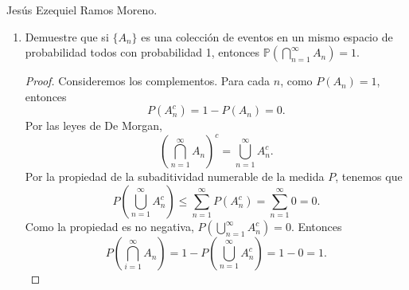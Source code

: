 \documentclass{article}
\newcommand{\ntarea}{1}
\begin{document}
\pagestyle{fancy}
\rhead{Tarea \ntarea}

\large{Jesús Ezequiel Ramos Moreno.}
\begin{enumerate}
    \item[2.] Demuestre que si \(\{A_n\}\) es una colección de eventos en un mismo espacio de probabilidad todos con probabilidad 1, entonces \(\mathbb{P}(\bigcap_{n=1}^{\infty} A_n) = 1\).
    \begin{proof}
        Consideremos los complementos. Para cada \(n\), como \(P(A_n) = 1\), entonces
        \[
        P(A_n^c) = 1 - P(A_n) = 0.
        \]
        Por las leyes de De Morgan,
        \[
        {\left(\bigcap_{n = 1}^\infty A_n\right)}^c = \bigcup_{n = 1}^\infty A_n ^c.
        \]
        Por la propiedad de la subaditividad numerable de la medida \(P\), tenemos que
        \[
        P\left(\bigcup_{n = 1} ^\infty A_n ^c\right) \leq \sum_{n = 1}^{\infty}P(A_n^c) = \sum_{n=1}^{\infty}0 = 0.
        \]
        Como la propiedad es no negativa, \(P\left(\bigcup_{n = 1} ^\infty A_n ^c\right) = 0\). Entonces 
        \[
        P\left(\bigcap_{i = 1}^\infty A_n\right) = 1 - P\left(\bigcup_{n = 1} ^\infty A_n ^c\right) = 1 - 0 = 1.
        \]
    \end{proof}
\end{enumerate}
\end{document}
